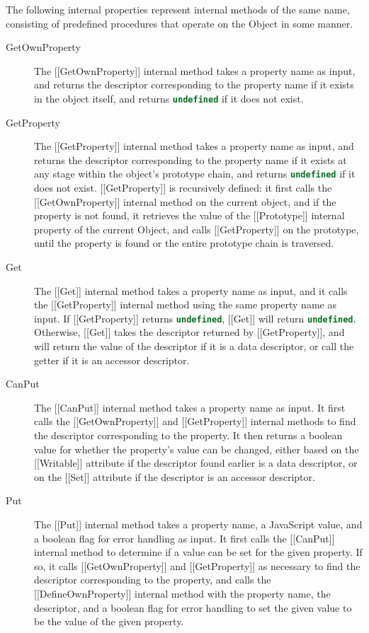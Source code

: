 \documentclass[a4paper,11pt,twoside]{report}
\def\jsinline{\lstinline[language=JavaScript, basicstyle=\small]}%\end{lstlisting}
\begin{document}
The following internal properties represent internal methods of the same name, consisting of predefined procedures that operate on the Object in some manner.
\begin{description}
\item[GetOwnProperty] The [[GetOwnProperty]] internal method takes a property name as input, and returns the descriptor corresponding to the property name if it exists in the object itself, and returns \jsinline|undefined| if it does not exist.

\item[GetProperty] The [[GetProperty]] internal method takes a property name as input, and returns the descriptor corresponding to the property name if it exists at any stage within the object's prototype chain, and returns \jsinline|undefined| if it does not exist. [[GetProperty]] is recursively defined: it first calls the [[GetOwnProperty]] internal method on the current object, and if the property is not found, it retrieves the value of the [[Prototype]] internal property of the current Object, and calls [[GetProperty]] on the prototype, until the property is found or the entire prototype chain is traversed.

\item[Get] The [[Get]] internal method takes a property name as input, and it calls the [[GetProperty]] internal method using the same property name as input. If [[GetProperty]] returns \jsinline|undefined|, [[Get]] will return \jsinline|undefined|. Otherwise, [[Get]] takes the descriptor returned by [[GetProperty]], and will return the value of the descriptor if it is a data descriptor, or call the getter if it is an accessor descriptor.

\item[CanPut] The [[CanPut]] internal method takes a property name as input. It first calls the [[GetOwnProperty]] and [[GetProperty]] internal methods to find the descriptor corresponding to the property. It then returns a boolean value for whether the property's value can be changed, either based on the [[Writable]] attribute if the descriptor found earlier is a data descriptor, or on the [[Set]] attribute if the descriptor is an accessor descriptor.

\item[Put] The [[Put]] internal method takes a property name, a JavaScript value, and a boolean flag for error handling as input. It first calls the [[CanPut]] internal method to determine if a value can be set for the given property. If so, it calls [[GetOwnProperty]] and [[GetProperty]] as necessary to find the descriptor corresponding to the property, and calls the [[DefineOwnProperty]] internal method with the property name, the descriptor, and a boolean flag for error handling to set the given value to be the value of the given property.


\end{description}
\end{document}
